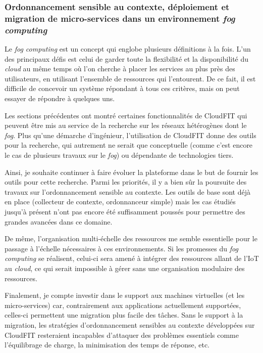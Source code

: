 \subsubsection*{Ordonnancement sensible au contexte, déploiement et migration de micro-services  dans un environnement \textit{fog computing}}

Le \textit{fog computing} est un concept qui englobe plusieurs définitions à la fois. L'un des principaux défis est celui de garder toute la flexibilité et la disponibilité du \textit{cloud} au même temps où l'on cherche à placer les services au plus près des utilisateurs, en utilisant l'ensemble de ressources qui l'entourent. De ce fait, il est difficile de concevoir un système répondant à tous ces critères, mais on peut essayer de répondre à quelques uns.

Les sections précédentes ont montré certaines fonctionnalités de CloudFIT qui peuvent être mis au service de la recherche sur les réseaux hétérogènes dont le \textit{fog}. 
Plus qu'une démarche d'ingénieur, l'utilisation de CloudFIT donne des outils pour la recherche, qui autrement ne serait que conceptuelle (comme c'est encore le cas de plusieurs travaux sur le \textit{fog}) ou dépendante de technologies tiers.

Ainsi, je souhaite continuer à faire évoluer la plateforme dans le but de fournir les outils pour cette recherche. Parmi les priorités, il y a bien sûr la poursuite des travaux sur l'ordonnancement sensible au contexte. Les outils de base sont déjà en place (collecteur de contexte, ordonnanceur simple) mais les cas étudiés jusqu'à présent n'ont pas encore été suffisamment poussés pour permettre des grandes avancées dans ce domaine. 

De même, l'organisation multi-échelle des ressources me semble essentielle pour le passage à l'échelle nécessaires à ces environnements. Si les promesses du \textit{fog computing} se réalisent, celui-ci sera amené à intégrer des ressources allant de l'IoT au \textit{cloud}, ce qui serait impossible à gérer sans une organisation modulaire des ressources.  
 
Finalement, je compte investir dans le support aux machines virtuelles (et les micro-services) car, contrairement aux applications actuellement supportées, celles-ci permettent une migration plus facile des tâches. Sans le support à la migration, les stratégies d'ordonnancement sensibles au contexte développées sur CloudFIT resteraient incapables d'attaquer des problèmes essentiels comme l'équilibrage de charge, la minimisation des temps de réponse, etc. 
